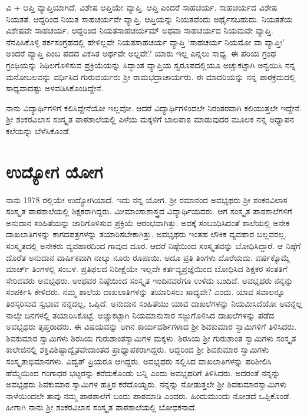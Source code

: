{ವಿ + ಆಪ್ತಿ   \enginline{-}   ವ್ಯಾಪ್ತಿಯಾಗಿದೆ.  ವಿಶೇಷ ಆಪ್ತಿಯೇ ವ್ಯಾಪ್ತಿ.  ಆಪ್ತಿ ಎಂದರೆ ಸಾಹಚರ್ಯ.  ಸಾಹಚರ್ಯದ ವಿಶೇಷ ನಿಯತತೆ.  ಆದ್ದರಿಂದ ನಿಯತ ಸಾಹಚರ್ಯವೇ ವ್ಯಾಪ್ತಿ. ಆಪ್ತಿಯನ್ನು ನಿಯತವೆಂದು ಅರ್ಥೈಸಬಹುದು.  ನಿಯತತೆಯ ವಿಶೇಷವೇ ಸಾಹಚರ್ಯ.  ಆದ್ದರಿಂದ ನಿಯತಸಾಹಚರ್ಯಮ್ ಅಥವಾ ಸಾಹಚರ್ಯದ ನಿಯಮವೇ ವ್ಯಾಪ್ತಿ.  ನೆನಪಿಸಿಕೊಳ್ಳಿ ತರ್ಕಸಂಗ್ರಹದಲ್ಲಿ ಹೇಳಿಲ್ಲವೇ ನಿಯತಸಾಹಚರ್ಯ ವ್ಯಾಪ್ತಿ   \enginline{-}   ‘ಸಾಹಚರ್ಯ ನಿಯಮೋ ವಾ ವ್ಯಾಪ್ತಿಃ’ ಅಂದರೆ ವ್ಯಾಪ್ತಿ ಎಂಬ ಪದದ ವಿಕಸಿತ ಅರ್ಥವೇ  ಅಲ್ಲವೇ? ಯಾರು ಇಲ್ಲ ಎನ್ನಲು ಸಾಧ್ಯ. ಈ ಪರಿಯ ಗ್ರಂಥ ಗ್ರಂಥಿಯನ್ನು ಶಿಥಿಲಗೊಳಿಸುವ ಪ್ರಕ್ರಿಯೆಯನ್ನು ಸಿದ್ಧಾಂತ ವ್ಯಾಪ್ತಿಯ ಸ್ವರೂಪದಲ್ಲಿಯೂ ಅಚ್ಚು\-ಕಟ್ಟಾಗಿ ಅನ್ವಯಿಸಿ ನನ್ನ ಮನೋಬಲವನ್ನು ವರ್ಧಿಸಿದ ಗುರುವರ್ಯರು ಶ್ರೀ ರಾಮಭದ್ರಾಚಾರ್ಯರು.  ಈ ಮಾದರಿಯನ್ನು ನನ್ನ ಪಾಠಕ್ರಮದಲ್ಲಿ ಸಾಧ್ಯವಾದಷ್ಟು ಅಳವಡಿಸಿ\-ಕೊಂಡಿದ್ದೇನೆ.

ನಾನು ವಿದ್ಯಾರ್ಥಿಗಳಿಗೆ ಕಲಿಸಿದ್ದೇನೆಯೋ ಇಲ್ಲವೋ.  ಆದರೆ ವಿದ್ಯಾರ್ಥಿಗಳಿಂದಲೇ ನಿರಂತರವಾಗಿ ಕಲಿಯುತ್ತಲೇ ಇದ್ದೇನೆ.  ಶ್ರೀ ಶಂಕರವಿಲಾಸ ಸಂಸ್ಕೃತ ಪಾಠಶಾಲೆಯಲ್ಲಿ ಎಳೆಯ ಮಕ್ಕಳಿಗೆ ಬಾಲಪಾಠ ಮಾಡುವುದರ ಮೂಲಕ ನನ್ನ ಅಧ್ಯಾಪನ ಕಲೆಯನ್ನು ಬೆಳೆಸಿ\-ಕೊಂಡೆ.

\section*{ಉದ್ಯೋಗ ಯೋಗ}

ನಾನು 1978 ರಲ್ಲಿಯೇ ಉದ್ಯೋಗಿಯಾದೆ.  ಇದು ನನ್ನ ಯೋಗ.  ಶ್ರೀ ರಮಾನಂದ ಅವಭೃಥರು ಶ್ರೀ ಶಂಕರವಿಲಾಸ ಸಂಸ್ಕೃತ ಪಾಠಶಾಲೆಯಲ್ಲಿ ಶಿಕ್ಷಕರಾಗಿದ್ದರು.  ಮೀಮಾಂಸಾಶಾಸ್ತ್ರದ ವಿದ್ಯಾರ್ಥಿಯವರು.  ಆಗ ಸಂಸ್ಕೃತ ಪಾಠಶಾಲೆಗಳಿಗೆ ಅನುದಾನ ಸಂಹಿತೆಯನ್ನು ಜಾರಿಗೊಳಿಸುವ ಪ್ರಕ್ರಿಯೆ ಆರಂಭವಾಗಿತ್ತು.  ಅದಕ್ಕೆ ಸಂಬಂಧಿಸಿದಂತೆ ಶಾಲೆಯಲ್ಲಿ ಅನೇಕ ದಾಖಲಾತಿಗಳನ್ನು ಕಾಗದಪತ್ರಗಳನ್ನು ತಯಾರಿಸಬೇಕಾಗಿತ್ತು.  ಅವ\-ಭೃಥರು ಇಂತಹ ಲೌಕಿಕ ವ್ಯವಹಾರ ಬಲ್ಲವರಲ್ಲ.  ಸಂಸ್ಕೃತದಲ್ಲಿ ಅನೇಕರು ವ್ಯವಹಾರದಿಂದ ಗಾವುದ ದೂರ.  ಆದರೆ ನಿಷ್ಠೆಯಿಂದ ಸಂಸ್ಕೃತವನ್ನು ಬೋಧಿಸಿದ್ದಾರೆ.  ಆ ನಿಷ್ಠೆಗೆ ದೊರೆತ ಅನುದಾನ ವಾರ್ಷಿಕವಾಗಿ ನಾಲ್ಕು ನೂರು ರೂಪಾಯಿ.  ಅದೂ ಪ್ರತಿ ತಿಂಗಳು ದೊರೆಯದು.  ವರ್ಷಕ್ಕೊಮ್ಮೆ ಮಾರ್ಚ್ ತಿಂಗಳಲ್ಲಿ ಸಂಬಳ.   ಪ್ರತಿಫಲದ ನಿರೀಕ್ಷೆಯೇ  ಇಲ್ಲದೇ ಕರ್ತವ್ಯಪ್ರಜ್ಞೆಯಿಂದ ಬೋಧಿಸಿದ ಶಿಕ್ಷಕರ ಸಂತತಿಗೆ ಸೇರಿದವರು ಅವ\-ಭೃಥರು.  ಅಂಥವರ ನಿಷ್ಠೆಯಿಂದ ಸಂಸ್ಕೃತ ಇಂದಿನವರೆಗೂ ಉಳಿದು ಬಂದಿದೆ.  ಅವಭೃಥರು ನನ್ನನ್ನು ಸಂಪರ್ಕಿಸಿ ಕೇಳಿದರು. ನಮ್ಮ ಶಾಲೆಯ ದಾಖಲಾತಿಗಳನ್ನು ತಯಾರಿಸಲು ಸಾಧ್ಯವೇ? ಎಂದು.  ಯಾವ ಸವಾಲನ್ನೂ ತಿರಸ್ಕರಿಸುವ ಸ್ವಭಾವ ನನ್ನದಲ್ಲ, ಒಪ್ಪಿದೆ.  ಅನುದಾನ ಸಂಹಿತೆಯು ಯಾವ ದಾಖಲೆಗಳನ್ನು ನಿಯಮಿಸಿದೆಯೋ ಅವನ್ನೆಲ್ಲ ನಾಲ್ಕೇ ದಿನಗಳಲ್ಲಿ ತಯಾರಿಸಿಕೊಟ್ಟೆ.  ಅಚ್ಚುಕಟ್ಟಾಗಿ ನಿಯಮಾನುಸಾರ ಸಜ್ಜುಗೊಳಿಸಿದ ದಾಖಲೆ\-ಗಳನ್ನು ಪಡೆದ ಅವಭೃಥರು ತೃಪ್ತರಾದರು.  ಈ ವಿಷಯವನ್ನು ಆಗಿನ ಕಾರ್ಯದರ್ಶಿ\-ಗಳಾದ ಶ್ರೀ ಶಿವಕುಮಾರ ಸ್ವಾಮಿಗಳಿಗೆ ತಿಳಿಸಿದರು.  ಶಿವಕುಮಾರ ಸ್ವಾಮಿಗಳು ಶಿರಸಿಯ ಗುರುಶಾಂತಸ್ವಾಮಿಗಳ ಮಕ್ಕಳು.  ಶಿರಸಿಯ ಶ್ರೀ ಗುರುಶಾಂತ ಸ್ವಾಮಿಗಳು ಸಂಸ್ಕೃತ ಕಾಲೇಜಿನಲ್ಲಿ  ಶಕ್ತಿವಿಶಿಷ್ಟಾದ್ವೈತವೇದಾಂತದ ಪ್ರಾಧ್ಯಾಪಕರಾಗಿದ್ದರು.  ಆದ್ದರಿಂದ ಶ್ರೀ ಶಿವಕುಮಾರ ಸ್ವಾಮಿಗಳು ಸಂಸ್ಕೃತಾಭಿಮಾನಗಳು. ವಿದ್ವತ್ ಪ್ರಿಯರೂ ಆಗಿದ್ದರು.  ಅವ\-ಭೃಥರು ಸಲ್ಲಿಸಿದ ದಾಖಲಾತಿಗಳನ್ನು ಪರಿಶೀಲಿಸಿ ಹೆಮ್ಮೆಯಿಂದ ಗಂಗಾಧರ ಭಟ್ಟರನ್ನು ಕರೆದುಕೊಂಡು ಬನ್ನಿ ಎಂದು ಅವ\-ಭೃಥರಿಗೆ ತಿಳಿಸಿದರು.  ಅದರಂತೆ ನನ್ನನ್ನು ಅವ\-ಭೃಥರು ಶಿವಕುಮಾರ ಸ್ವಾಮಿಗಳ ಹತ್ತಿರ ಕರೆದೊಯ್ದರು.  ನನ್ನನ್ನು ನೋಡುತ್ತಲೇ ಶ್ರೀ ಶಿವ\-ಕುಮಾರಸ್ವಾಮಿಗಳು ನಾಳೆಯಿಂದಲೇ ತಾವು ನಮ್ಮ ಪಾಠಶಾಲೆಗೆ ಬಂದು ಪಾಠಮಾಡಿ ಎಂದರು.  ಹಿಂದುಮುಂದು ನೋಡದೆ ಒಪ್ಪಿಕೊಂಡೆ.  ಹೀಗಾಗಿ ನಾನು ಶ್ರೀ ಶಂಕರ\-ವಿಲಾಸ ಸಂಸ್ಕೃತ ಪಾಠಶಾಲೆಯಲ್ಲಿ ಬೋಧಕನಾದೆ.  

}
